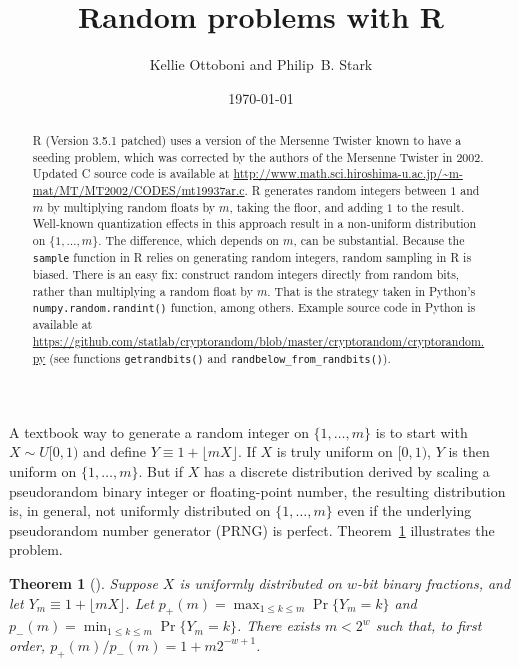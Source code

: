 \documentclass[12pt]{article}
\title{Random problems with R}
\author{Kellie Ottoboni and Philip~B. Stark}
\date{\today}
\newtheorem{theorem}{Theorem}
\begin{document}
\maketitle


\begin{abstract}
\noindent R (Version 3.5.1 patched) uses a version of the Mersenne Twister known to have
a seeding problem, which was corrected by the authors of the Mersenne Twister in 2002.
Updated C source code is available at \url{http://www.math.sci.hiroshima-u.ac.jp/~m-mat/MT/MT2002/CODES/mt19937ar.c}.
R generates random integers between $1$ and $m$
by multiplying random floats by $m$, taking the floor, and adding $1$ to the result.
Well-known quantization effects in this approach result in a 
non-uniform distribution on $\{ 1, \ldots, m\}$.
The difference, which depends on $m$, can be substantial.
Because the \texttt{sample} function in R relies on generating random integers,
random sampling in R is biased.
There is an easy fix: construct random integers directly from random bits, rather than
multiplying a random float by $m$.
That is the strategy taken in Python's \texttt{numpy.random.randint()} function, among
others.
Example source code in Python is available at \url{https://github.com/statlab/cryptorandom/blob/master/cryptorandom/cryptorandom.py} (see functions \texttt{getrandbits()} and \texttt{randbelow\_from\_randbits()}).
\end{abstract}



A textbook way to generate a random integer on 
$\{1, \dots, m\}$ is to start with $X \sim U[0,1)$ and define $Y \equiv 1 + \lfloor mX \rfloor$. 
If $X$ is truly uniform on $[0,1)$, $Y$ is then uniform on $\{1, \dots, m\}$.
But if $X$ has a discrete distribution derived by scaling a pseudorandom binary integer
or floating-point number, 
the resulting distribution is, in general, not uniformly distributed on 
$\{1, \ldots, m \}$ even if the underlying pseudorandom number generator 
(PRNG) is perfect.
Theorem~\ref{thm:theorem_1} illustrates the problem.

\begin{theorem}[\citet{knuth_art_1997}] %
\label{thm:theorem_1}
Suppose $X$ is uniformly distributed on $w$-bit binary fractions, and
let $Y_m \equiv 1 + \lfloor mX \rfloor$.
Let $p_+(m) = \max_{1 \le k \le m} \Pr\{Y_m = k\}$ and $p_-(m) = \min_{1 \le k \le m} \Pr\{Y_m = k\}$.
There exists $m < 2^w$ such that, to first order, 
$p_+(m)/p_-(m) = 1 + m2^{-w+1}$.
\end{theorem}
\end{document}
